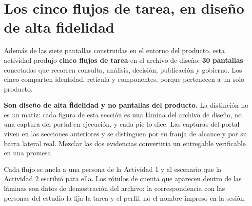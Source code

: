 %
%
%
%

\clearpage

\section{Los cinco flujos de tarea, en diseño de alta fidelidad}

Además de las siete pantallas construidas en el entorno del producto, esta actividad produjo
\textbf{cinco flujos de tarea} en el archivo de diseño: \textbf{30 pantallas} conectadas que
recorren consulta, análisis, decisión, publicación y gobierno. Los cinco comparten identidad,
retícula y componentes, porque pertenecen a un solo producto.

\textbf{Son diseño de alta fidelidad y no pantallas del producto.} La distinción no es un matiz:
cada figura de esta sección es una lámina del archivo de diseño, no una captura del portal en
ejecución, y cada pie lo dice. Las capturas del portal viven en las secciones anteriores y se
distinguen por su franja de alcance y por su barra lateral real. Mezclar las dos evidencias
convertiría un entregable verificable en una promesa.

Cada flujo se ancla a una persona de la Actividad 1 y al escenario que la Actividad 2 escribió para
ella. Los rótulos de cuenta que aparecen dentro de las láminas son datos de demostración del
archivo; la correspondencia con las personas del estudio la fija la tarea y el perfil, no el nombre
impreso en la sesión.

